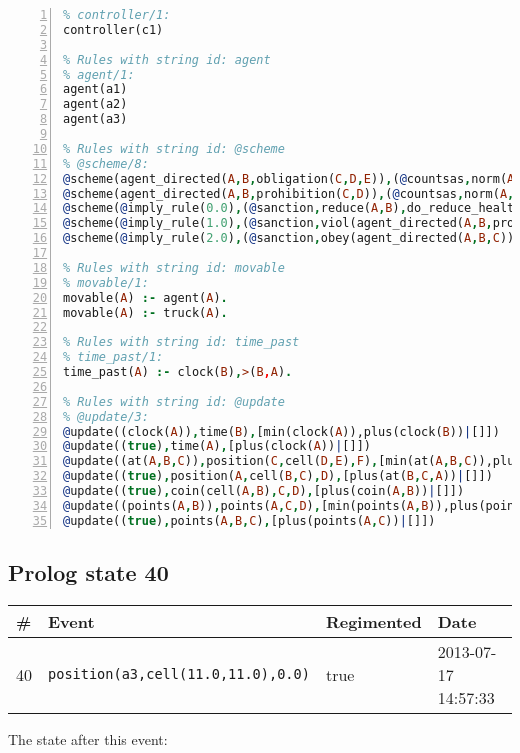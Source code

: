 \documentclass[11pt]{article}\usepackage[utf8]{inputenc}\usepackage{geometry}
\begin{document}
\begin{lstlisting}[language=Prolog, numbers=left]
% Rules with string id: controller
% controller/1:
controller(c1)

% Rules with string id: agent
% agent/1:
agent(a1)
agent(a2)
agent(a3)

% Rules with string id: @scheme
% @scheme/8:
@scheme(agent_directed(A,B,obligation(C,D,E)),(@countsas,norm(A,B,F,obligation(C,D,E)),F),false,(listTrue(C)),(time_past(D)),false,[plus(viol(agent_directed(A,B,obligation(C,D,E))))|[]],[plus(obey(agent_directed(A,B,obligation(C,D,E))))|[]])
@scheme(agent_directed(A,B,prohibition(C,D)),(@countsas,norm(A,B,E,prohibition(C,D)),E),(listTrue(C)),false,(false),false,[plus(viol(agent_directed(A,B,prohibition(C,D))))|[]],[plus(obey(agent_directed(A,B,prohibition(C,D))))|[]])
@scheme(@imply_rule(0.0),(@sanction,reduce(A,B),do_reduce_health(A,B),notifyAgent(A,changed(status))),true,false,false,false,[min(reduce(A,B))|[]],[])
@scheme(@imply_rule(1.0),(@sanction,viol(agent_directed(A,B,prohibition(C,D))),do_sanction(D)),true,false,false,false,[min(viol(agent_directed(A,B,prohibition(C,D))))|[]],[])
@scheme(@imply_rule(2.0),(@sanction,obey(agent_directed(A,B,C))),true,false,false,false,[min(obey(agent_directed(A,B,C)))|[]],[])

% Rules with string id: movable
% movable/1:
movable(A) :- agent(A).
movable(A) :- truck(A).

% Rules with string id: time_past
% time_past/1:
time_past(A) :- clock(B),>(B,A).

% Rules with string id: @update
% @update/3:
@update((clock(A)),time(B),[min(clock(A)),plus(clock(B))|[]])
@update((true),time(A),[plus(clock(A))|[]])
@update((at(A,B,C)),position(C,cell(D,E),F),[min(at(A,B,C)),plus(at(D,E,C))|[]])
@update((true),position(A,cell(B,C),D),[plus(at(B,C,A))|[]])
@update((true),coin(cell(A,B),C,D),[plus(coin(A,B))|[]])
@update((points(A,B)),points(A,C,D),[min(points(A,B)),plus(points(A,D))|[]])
@update((true),points(A,B,C),[plus(points(A,C))|[]])

\end{lstlisting}
\clearpage 
\subsection{Prolog state 40}
\begin{table}[ht]
\centering 
\begin{tabular}{l l l l} 
\textbf{\#} & \textbf{Event} & \textbf{Regimented} & \textbf{Date} \\ [0.5ex] 
\hline
40&\texttt{position(a3,cell(11.0,11.0),0.0)}&true&2013-07-17 14:57:33\\ [1ex] \hline\end{tabular}
\end{table}
The state after this event:
\end{document}
